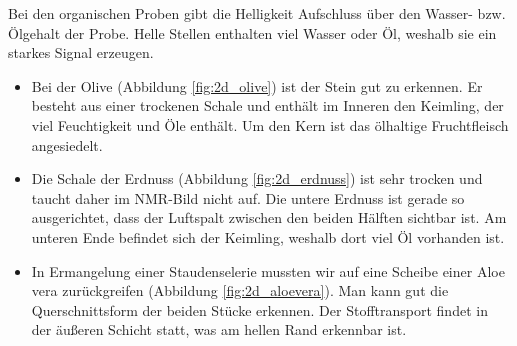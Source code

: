 \documentclass[a4paper]{scrartcl} %
\begin{document}
Bei den organischen Proben gibt die Helligkeit Aufschluss über den Wasser- bzw. Ölgehalt der Probe. Helle Stellen enthalten viel Wasser oder Öl, weshalb sie ein starkes Signal erzeugen. 

\begin{itemize}
	\item Bei der Olive (Abbildung \ref{fig:2d_olive}) ist der Stein gut zu erkennen. Er besteht aus einer trockenen Schale und enthält im Inneren den Keimling, der viel Feuchtigkeit und Öle enthält. Um den Kern ist das ölhaltige Fruchtfleisch angesiedelt. 
	\item Die Schale der Erdnuss (Abbildung \ref{fig:2d_erdnuss}) ist sehr trocken und taucht daher im NMR-Bild nicht auf. Die untere Erdnuss ist gerade so ausgerichtet, dass der Luftspalt zwischen den beiden Hälften sichtbar ist. Am unteren Ende befindet sich der Keimling, weshalb dort viel Öl vorhanden ist.
	\item In Ermangelung einer Staudenselerie mussten wir auf eine Scheibe einer Aloe vera zurückgreifen (Abbildung \ref{fig:2d_aloevera}). Man kann gut die Querschnittsform der beiden Stücke erkennen. Der Stofftransport findet in der äußeren Schicht statt, was am hellen Rand erkennbar ist.
\end{itemize}
\end{document}
